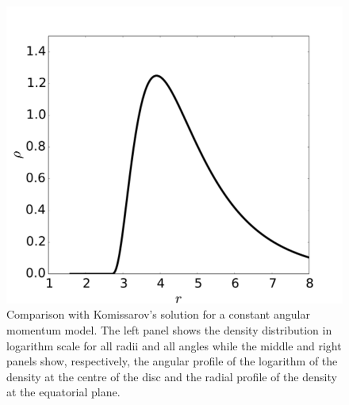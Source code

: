 \documentclass[referee]{aa}
\begin{document}
\begin{figure}[t]
\includegraphics[scale=0.14]{figures/fig1c.pdf}
\caption{Comparison with Komissarov's solution for a constant angular momentum model. The left panel shows the density distribution in logarithm scale for all radii and all angles while the middle and right panels show, respectively, the angular profile of the logarithm of the density at the centre of the disc and the radial profile of the density at the equatorial plane.}
\label{komissarov}
\end{figure}
\end{document}
